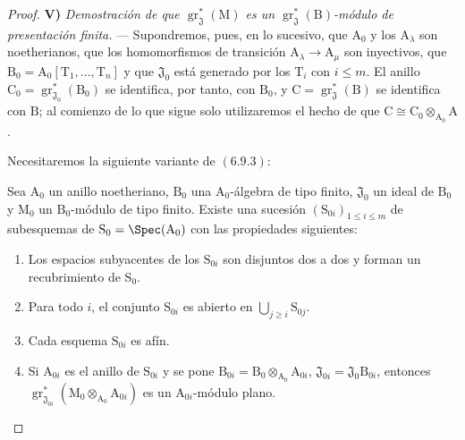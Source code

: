 \begin{proof}
\medskip
\noindent\textbf{V)} \emph{Demostración de que $\operatorname{gr}^*_\mathfrak{J}(\mathrm{M})$ es un $\operatorname{gr}^*_\mathfrak{J}(\mathrm{B})$-módulo de presentación finita.} --- Supondremos, pues, en lo sucesivo, que $\mathrm{A}_0$ y los $\mathrm{A}_\lambda$ son noetherianos, que los homomorfismos de transición $\mathrm{A}_\lambda\to\mathrm{A}_\mu$ son inyectivos, que $\mathrm{B}_0=\mathrm{A}_0[\mathrm{T}_1,\ldots,\mathrm{T}_n]$ y que $\mathfrak{J}_0$ está generado por los $\mathrm{T}_i$ con $i\leqslant m$. El anillo $\mathrm{C}_0=\operatorname{gr}^*_{\mathfrak{J}_0}(\mathrm{B}_0)$ se identifica, por tanto, con $\mathrm{B}_0$, y $\mathrm{C}=\operatorname{gr}^*_\mathfrak{J}(\mathrm{B})$ se identifica con $\mathrm{B}$; al comienzo de lo que sigue solo utilizaremos el hecho de que $\mathrm{C}\cong\mathrm{C}_0\otimes_{\mathrm{A}_0}\mathrm{A}$.

Necesitaremos la siguiente variante de $(6.9.3)$:

\begin{lemma}[11.2.9.5]
\label{IV.11.2.9.5}
Sea $\mathrm{A}_0$ un anillo noetheriano, $\mathrm{B}_0$ una
$\mathrm{A}_0$-álgebra de tipo finito, $\mathfrak{J}_0$ un ideal de
$\mathrm{B}_0$ y $\mathrm{M}_0$ un $\mathrm{B}_0$-módulo de tipo finito.
Existe una sucesión $(\mathrm{S}_{0i})_{1\leqslant i\leqslant m}$ de
subesquemas de $\mathrm{S}_0=\Spec(\mathrm{A}_0)$ con las propiedades
siguientes:
\begin{enumerate}[label=\arabic{enumi}\textsuperscript{o}]
  \item Los espacios subyacentes de los $\mathrm{S}_{0i}$ son disjuntos dos a dos y forman un recubrimiento de $\mathrm{S}_0$.
  \item Para todo $i$, el conjunto $\mathrm{S}_{0i}$ es abierto en $\bigcup_{j\geqslant i}\mathrm{S}_{0j}$.
  \item Cada esquema $\mathrm{S}_{0i}$ es afín.
  \item Si $\mathrm{A}_{0i}$ es el anillo de $\mathrm{S}_{0i}$ y se pone $\mathrm{B}_{0i}=\mathrm{B}_0\otimes_{\mathrm{A}_0}\mathrm{A}_{0i}$, $\mathfrak{J}_{0i}=\mathfrak{J}_0\mathrm{B}_{0i}$, entonces $\operatorname{gr}^*_{\mathfrak{J}_{0i}}(\mathrm{M}_0\otimes_{\mathrm{A}_0}\mathrm{A}_{0i})$ es un $\mathrm{A}_{0i}$-módulo plano.
\end{enumerate}
\end{lemma}


\end{proof}
